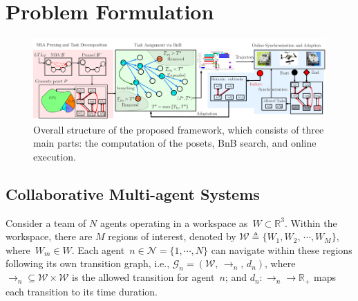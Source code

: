 \section{Problem Formulation}\label{sec:problem}

\begin{figure}[t!]
	\centering
	\includegraphics[width=0.9\linewidth]{figures/logic_fig1.pdf}
	\caption{Overall structure of the proposed framework,
          which consists of three main parts:
        the computation of the posets, BnB search, and online execution.}
	\label{fig:logic_graph}
\end{figure}

\subsection{Collaborative Multi-agent Systems}\label{subsec:multi-agent}

Consider a team of $N$ agents operating in a workspace as~$W\subset \mathbb{R}^3$.
Within the workspace, there are $M$ regions of interest,
denoted by $\mathcal{W}\triangleq \{W_1,W_2,\,\cdots,W_M\}$, where~$W_m\in W$.
Each agent~$n\in\mathcal{N}=\{1,\cdots,N\}$ can navigate within these regions
following its own transition graph, i.e., $\mathcal{G}_n=(\mathcal{W},\,\rightarrow_n,\,d_n)$,
where $\rightarrow_n\subseteq \mathcal{W}\times \mathcal{W}$
is the allowed transition for agent~$n$;
and $d_n:\rightarrow_n \rightarrow \mathbb{R}_{+}$ maps each transition to its time duration.

